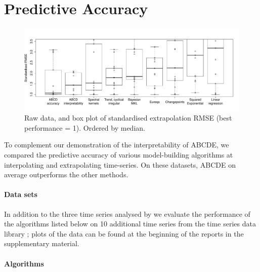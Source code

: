 \documentclass[letterpaper]{article}
\def\eg{e.g.\ }
\newcommand{\procedurename}{ABCDE}
\begin{document}
\section{Predictive Accuracy}
\label{sec:numerical}

\begin{figure}[ht]
\centering
\includegraphics[width=\textwidth]{figures/box_extrap_wide}
\caption{
Raw data, and box plot of standardised extrapolation RMSE (best performance = 1).
Ordered by median.
}
\label{fig:box_extrap_dist}
\end{figure}

To complement our demonstration of the interpretability of \procedurename{}, we compared the predictive accuracy of various model-building algorithms at interpolating and extrapolating time-series.
On these datasets, \procedurename{} on average outperforms the other methods.%

\paragraph{Data sets}

In addition to the three time series analysed by \cite{DuvLloGroetal13} we evaluate the performance of the algorithms listed below on 10 additional time series from the time series data library \citep{TSDL}; plots of the data can be found at the beginning of the reports in the supplementary material.

\paragraph{Algorithms}
\end{document}
